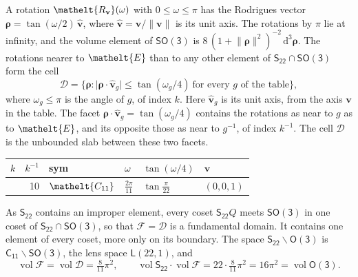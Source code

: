 \documentclass[10pt,a4paper]{article}
\numberwithin{equation}{section}
\newcommand{\eltfont}[1]{{\let\sigma\eltsigma\mathelt{#1}}}
\newcommand{\grp}[1]{\mathsf{#1}}
\newcommand{\cls}[1]{\eltfont{#1}}
\newcommand{\elt}[1]{\eltfont{#1}}
\newcommand{\dirvec}[3]{(#1, #2, #3)}
\newcommand{\unitaxis}{\hat{\mathbf{v}}}
\newcommand{\vv}{\mathbf{v}}
\newcommand{\diff}{\mathrm{d}}
\newcommand{\vol}{\operatorname{vol}}
\newcommand{\rodrigues}{\boldsymbol{\rho}}
\newcommand{\fcell}{\mathcal{D}}
\newcommand{\fdomain}{\mathcal{F}}
\newcommand{\lensspace}[2]{\mathsf{L}(#1, #2)}
\begin{document}
\leavevmode\label{n:vector.rodrigues}\label{n:vector.unitaxis}A rotation $\elt{R_{\vv}}(\omega)$ with $0 \le \omega \le \pi$ has the Rodrigues vector $\rodrigues = \tan(\omega/2)\,\unitaxis$, where $\unitaxis = \vv/\lVert\vv\rVert$ is its unit axis. The rotations by $\pi$ lie at infinity, and the volume element of \href{SO3.pdf}{$\grp{SO(3)}$} is $8\,(1 + \lVert\rodrigues\rVert^2)^{-2}\,\diff^3\rodrigues$.
\leavevmode\label{n:set.cell}The rotations nearer to $\elt{E}$ than to any other element of $\grp{S_{22}} \cap \grp{SO(3)}$ form the cell
\begin{equation}\label{e:cell}\fcell = \bigl\{\rodrigues : \lvert\rodrigues\cdot\unitaxis_g\rvert \le \tan(\omega_g/4)\ \text{for every $g$ of the table}\bigr\},\end{equation}
where $\omega_g \le \pi$ is the angle of $g$, of index $k$. Here $\unitaxis_g$ is its unit axis, from the axis $\vv$ in the table. The facet $\rodrigues\cdot\unitaxis_g = \tan(\omega_g/4)$ contains the rotations as near to $g$ as to $\elt{E}$, and its opposite those as near to $g^{-1}$, of index $k^{-1}$. The cell $\fcell$ is the unbounded slab between these two facets.
{\small{\renewcommand{\arraystretch}{1.3}\begin{longtable}{@{}rrllll@{}}\toprule
$k$ & $k^{-1}$ & sym & $\omega$ & $\tan(\omega/4)$ & $\vv$\\\midrule\endhead
\bottomrule\endfoot\endlastfoot
1 & 10 & $\cls{C_{11}}$ & $\tfrac{2\pi}{11}$ & $\tan\tfrac{\pi}{22}$ & $\dirvec{0}{0}{1}$\\
\bottomrule\end{longtable}}}

\leavevmode\label{n:set.fundamental}As $\grp{S_{22}}$ contains an improper element, every coset $\grp{S_{22}}Q$ meets \href{SO3.pdf}{$\grp{SO(3)}$} in one coset of $\grp{S_{22}} \cap \grp{SO(3)}$, so that $\fdomain = \fcell$ is a fundamental domain. It contains one element of every coset, more only on its boundary.
\leavevmode\label{n:set.lens}The space $\grp{S_{22}}\backslash\grp{O(3)}$ is $\grp{C_{11}}\backslash\grp{SO(3)}$, the lens space $\lensspace{22}{1}$, and
\begin{equation}\label{e:volume}\vol\fdomain = \vol\fcell = \tfrac{8}{11}\pi^2,\qquad \vol\grp{S_{22}}\cdot\vol\fdomain = 22\cdot \tfrac{8}{11}\pi^2 = 16\pi^2 = \vol\grp{O(3)}.\end{equation}
\end{document}
